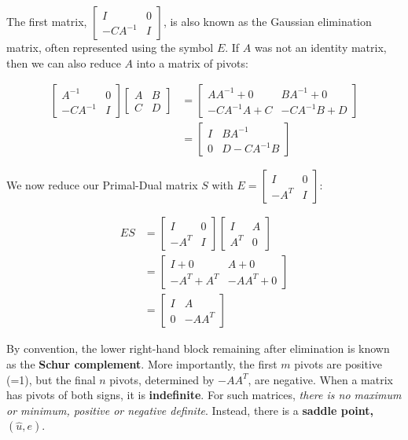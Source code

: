 \documentclass[]{article}
\begin{document}
The first matrix, $\begin{bmatrix} I & 0 \\ -CA^{-1} & I \end{bmatrix}$, is also known as the Gaussian elimination matrix, often represented using the symbol $E$. If $A$ was not an identity matrix, then we can also reduce $A$ into a matrix of pivots: 

\begin{align}
\begin{bmatrix} A^{-1} & 0 \\ -CA^{-1} & I \end{bmatrix} \begin{bmatrix} A & B \\ C & D \end{bmatrix} &= \begin{bmatrix} AA^{-1} + 0 & BA^{-1} + 0 \\ -CA^{-1}A + C & -CA^{-1}B + D \end{bmatrix} \\
&= \begin{bmatrix} I & BA^{-1} \\ 0 & D - CA^{-1}B \end{bmatrix} 
\end{align}


We now reduce our Primal-Dual matrix $S$ with $E = \begin{bmatrix} I & 0 \\ -A^T & I \end{bmatrix}$:

\begin{align}
ES &= \begin{bmatrix} I & 0 \\ -A^T & I \end{bmatrix} \begin{bmatrix} I & A \\ A^T & 0 \end{bmatrix} \\
	&= \begin{bmatrix} I + 0 & A + 0 \\ -A^T + A^T & -AA^T + 0 \end{bmatrix} \\
	&= \begin{bmatrix} I & A \\ 0 & -AA^T \end{bmatrix}
\end{align}

By convention, the lower right-hand block remaining after elimination is known as the \textbf{Schur complement}. More importantly, the first $m$ pivots are positive (=1), but the final $n$ pivots, determined by $-AA^T$, are negative. When a matrix has pivots of both signs, it is \textbf{indefinite}. For such matrices, \textit{there is no maximum or minimum, positive or negative definite}. Instead, there is a \textbf{saddle point, $(\hat{u}, e)$}.
\end{document}
